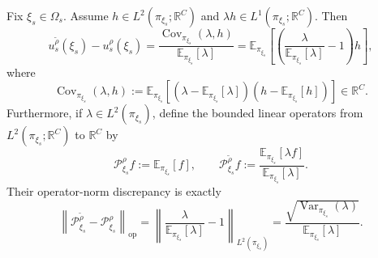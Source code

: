 \begin{proposition}
\label{prop:physics_state_bias}
Fix $\xi_s\in\Omega_s$. Assume $h\in L^2(\pi_{\xi_s};\mathbb{R}^{C})$ and $\lambda h\in L^1(\pi_{\xi_s};\mathbb{R}^{C})$. Then
\begin{equation}
    u_s^{\widetilde{\rho}}(\xi_s)-u_s^{\rho}(\xi_s)
    =\frac{\operatorname{Cov}_{\pi_{\xi_s}}(\lambda,h)}
    {\mathbb{E}_{\pi_{\xi_s}}[\lambda]}
    =\mathbb{E}_{\pi_{\xi_s}}\!\left[\left(
    \frac{\lambda}{\mathbb{E}_{\pi_{\xi_s}}[\lambda]}-1\right)h\right],
    \label{eq:app_exact_state_bias}
\end{equation}
where
\begin{equation}
    \operatorname{Cov}_{\pi_{\xi_s}}(\lambda,h)
    :=\mathbb{E}_{\pi_{\xi_s}}\!\left[
    (\lambda-\mathbb{E}_{\pi_{\xi_s}}[\lambda])
    \left(h-\mathbb{E}_{\pi_{\xi_s}}[h]\right)\right]\in\mathbb{R}^{C}.
    \label{eq:app_vector_covariance}
\end{equation}
Furthermore, if $\lambda\in L^2(\pi_{\xi_s})$, define the bounded linear operators from $L^2(\pi_{\xi_s};\mathbb{R}^{C})$ to $\mathbb{R}^{C}$ by
\begin{equation}
    \mathcal{P}_{\xi_s}^{\rho}f
    :=\mathbb{E}_{\pi_{\xi_s}}[f],
    \qquad
    \mathcal{P}_{\xi_s}^{\widetilde{\rho}}f
    :=\frac{\mathbb{E}_{\pi_{\xi_s}}[\lambda f]}
    {\mathbb{E}_{\pi_{\xi_s}}[\lambda]}.
    \label{eq:app_state_operators}
\end{equation}
Their operator-norm discrepancy is exactly
\begin{equation}
    \left\|\mathcal{P}_{\xi_s}^{\widetilde{\rho}}
    -\mathcal{P}_{\xi_s}^{\rho}\right\|_{\mathrm{op}}
    =\left\|\frac{\lambda}{\mathbb{E}_{\pi_{\xi_s}}[\lambda]}-1\right\|_{L^2(\pi_{\xi_s})}
    =\frac{\sqrt{\operatorname{Var}_{\pi_{\xi_s}}(\lambda)}}
    {\mathbb{E}_{\pi_{\xi_s}}[\lambda]}.
    \label{eq:app_exact_state_operator_norm}
\end{equation}
\end{proposition}

